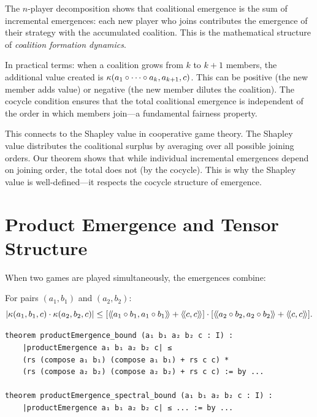 \begin{interpretation}
The $n$-player decomposition shows that coalitional emergence is the sum of
incremental emergences: each new player who joins contributes the emergence of
their strategy with the accumulated coalition. This is the mathematical structure
of \emph{coalition formation dynamics}.

In practical terms: when a coalition grows from $k$ to $k+1$ members, the
additional value created is $\kappa(a_1 \circ \cdots \circ a_k, a_{k+1}, c)$.
This can be positive (the new member adds value) or negative (the new member
dilutes the coalition). The cocycle condition ensures that the total coalitional
emergence is independent of the order in which members join---a fundamental
fairness property.

This connects to the Shapley value in cooperative game theory. The Shapley value
distributes the coalitional surplus by averaging over all possible joining
orders. Our theorem shows that while individual incremental emergences depend
on joining order, the total does not (by the cocycle). This is why the Shapley
value is well-defined---it respects the cocycle structure of emergence.
\end{interpretation}


\section{Product Emergence and Tensor Structure}

When two games are played simultaneously, the emergences combine:

\begin{theorem}
\label{thm:product-emergence}
For pairs $(a_1, b_1)$ and $(a_2, b_2)$:
\[
  |\emerge(a_1, b_1, c) \cdot \emerge(a_2, b_2, c)| \leq
  [\rs{a_1 \compose b_1}{a_1 \compose b_1} + \rs{c}{c}]
  \cdot [\rs{a_2 \compose b_2}{a_2 \compose b_2} + \rs{c}{c}].
\]
\end{theorem}

\begin{lstlisting}[caption={Product emergence (IDT\_v3\_Emergence.lean)}]
theorem productEmergence_bound (a₁ b₁ a₂ b₂ c : I) :
    |productEmergence a₁ b₁ a₂ b₂ c| ≤
    (rs (compose a₁ b₁) (compose a₁ b₁) + rs c c) *
    (rs (compose a₂ b₂) (compose a₂ b₂) + rs c c) := by ...

theorem productEmergence_spectral_bound (a₁ b₁ a₂ b₂ c : I) :
    |productEmergence a₁ b₁ a₂ b₂ c| ≤ ... := by ...
\end{lstlisting}

